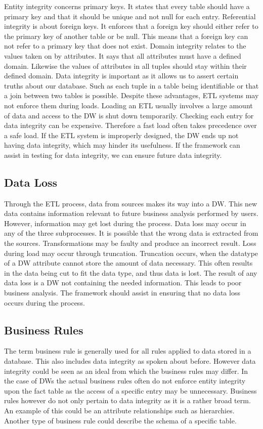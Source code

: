 Entity integrity concerns primary keys. It states that every table should have a primary key and that it should be unique and not null for each entry. Referential integrity is about foreign keys. It enforces that a foreign key should either refer to the primary key of another table or be null. This means that a foreign key can not refer to a primary key that does not exist.  Domain integrity relates to the values taken on by attributes. It says that all attributes must have a defined domain. Likewise the values of attributes in all tuples should stay within their defined domain. Data integrity is important as it allows us to assert certain truths about our database. Such as each tuple in a table being identifiable or that a join between two tables is possible. Despite these advantages, ETL systems may not enforce them during loads. Loading an ETL usually involves a large amount of data and access to the DW is shut down temporarily. Checking each entry for data integrity can be expensive. Therefore a fast load often takes precedence over a safe load. If the ETL system is improperly designed, the DW ends up not having data integrity, which may hinder its usefulness. If the framework can assist in testing for data integrity, we can ensure future data integrity.

\subsection{Data Loss}
Through the ETL process, data from sources makes its way into a DW. This new data contains information relevant to future business analysis performed by users. However, information may get lost during the process. Data loss may occur in any of the three subprocesses. It is possible that the wrong data is extracted from the sources. Transformations may be faulty and produce an incorrect result. Loss during load may occur  through truncation. Truncation occurs, when the datatype of a DW attribute cannot store the amount of data necessary. This often results in the data being cut to fit the data type, and thus data is lost.  The result of any data loss is a DW not containing the needed information. This leads to poor business analysis. The framework should assist in ensuring that no data loss occurs during the process.

\subsection{Business Rules}
The term business rule is generally used for all rules applied to data stored in a database. This also includes data integrity as spoken about before. However data integrity could be seen as an ideal from which the business rules may differ. In the case of DWs the actual business rules often do not enforce entity integrity upon the fact table as the access of a specific entry may be unnecessary. Business rules however do not only pertain to data integrity as it is a rather broad term. An example of this could be an attribute relationships such as hierarchies. Another type of business rule could describe the schema of a specific table. 






